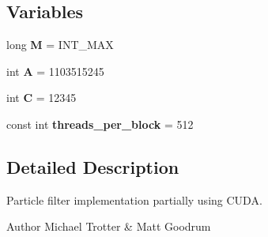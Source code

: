 \subsection*{Variables}
\begin{DoxyCompactItemize}
\item 
\hypertarget{ex__particle__CUDA__naive_8cu_a4bc2e1f1527e2a5d555689a4288c341f}{
long {\bfseries M} = INT\_\-MAX}
\label{ex__particle__CUDA__naive_8cu_a4bc2e1f1527e2a5d555689a4288c341f}

\item 
\hypertarget{ex__particle__CUDA__naive_8cu_a56a52f73797a8d06045cf5bc1ab831bf}{
int {\bfseries A} = 1103515245}
\label{ex__particle__CUDA__naive_8cu_a56a52f73797a8d06045cf5bc1ab831bf}

\item 
\hypertarget{ex__particle__CUDA__naive_8cu_a5464533d23b59ba11030432e73528730}{
int {\bfseries C} = 12345}
\label{ex__particle__CUDA__naive_8cu_a5464533d23b59ba11030432e73528730}

\item 
\hypertarget{ex__particle__CUDA__naive_8cu_ac1fd9bf7fbbc3bd648ba96689efd1982}{
const int {\bfseries threads\_\-per\_\-block} = 512}
\label{ex__particle__CUDA__naive_8cu_ac1fd9bf7fbbc3bd648ba96689efd1982}

\end{DoxyCompactItemize}


\subsection{Detailed Description}
Particle filter implementation partially using CUDA. \begin{DoxyAuthor}{Author}
Michael Trotter \& Matt Goodrum 
\end{DoxyAuthor}


